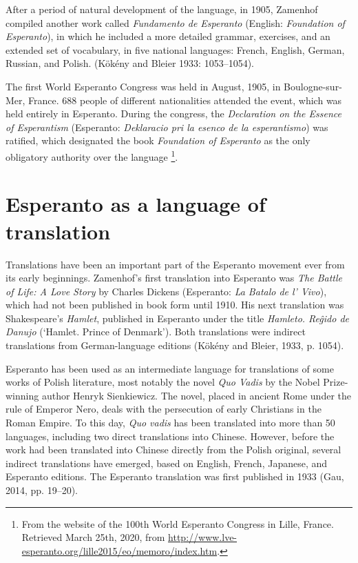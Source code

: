 After a period of natural development of the language, in 1905, Zamenhof compiled another work called \textit{Fundamento de Esperanto} (English: \textit{Foundation of Esperanto}), in which he included a more detailed grammar, exercises, and an extended set of vocabulary, in five national languages: French, English, German, Russian, and Polish.
(Kökény and Bleier 1933: 1053--1054).

The first World Esperanto Congress was held in August, 1905, in Boulogne-sur-Mer, France.
688 people of different nationalities attended the event, which was held entirely in Esperanto.
During the congress, the \textit{Declaration on the Essence of Esperantism} (Esperanto: \textit{Deklaracio pri la esenco de la esperantismo}) was ratified, which designated the book \textit{Foundation of Esperanto} as the only obligatory authority over the language%
\footnote{From the website of the 100th World Esperanto Congress in Lille, France. Retrieved March 25th, 2020, from \url{http://www.lve-esperanto.org/lille2015/eo/memoro/index.htm}.}.

\section{Esperanto as a language of translation} \label{esperanto_translations}
Translations have been an important part of the Esperanto movement ever from its early beginnings.
Zamenhof's first translation into Esperanto was \textit{The Battle of Life: A Love Story} by Charles Dickens (Esperanto: \textit{La Batalo de l' Vivo}), which had not been published in book form until 1910.
His next translation was Shakespeare's \textit{Hamlet}, published in Esperanto under the title \textit{Hamleto. Reĝido de Danujo} (`Hamlet. Prince of Denmark').
Both translations were indirect translations from German-language editions
(Kökény and Bleier, 1933, p. 1054).

Esperanto has been used as an intermediate language for translations of some works of Polish literature, most notably the novel \textit{Quo Vadis} by the Nobel Prize-winning author Henryk Sienkiewicz.
The novel, placed in ancient Rome under the rule of Emperor Nero, deals with the persecution of early Christians in the Roman Empire.
To this day, \textit{Quo vadis} has been translated into more than 50 languages, including two direct translations into Chinese.
However, before the work had been translated into Chinese directly from the Polish original, several indirect translations have emerged, based on English, French, Japanese, and Esperanto editions.
The Esperanto translation was first published in 1933
(Gau, 2014, pp. 19--20).

